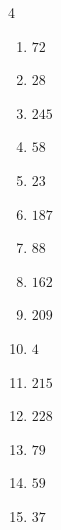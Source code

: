 \begin{multicols}{4}
\begin{enumerate}

  \item $72$


  \item $28$


  \item $245$


  \item $58$


  \item $23$


  \item $187$


\columnbreak %

  \item $88$


  \item $162$


  \item $209$


  \item $4$


  \item $215$


  \item $228$


  \item $79$


  \item $59$


  \item $37$



\end{enumerate}
\end{multicols}
